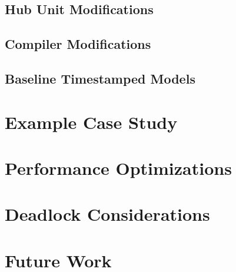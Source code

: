 
\subsection{Hub Unit Modifications}

\subsection{Compiler Modifications}

\subsection{Baseline Timestamped Models}

\section{Example Case Study}


\section{Performance Optimizations}

\section{Deadlock Considerations}


\section{Future Work}


%
